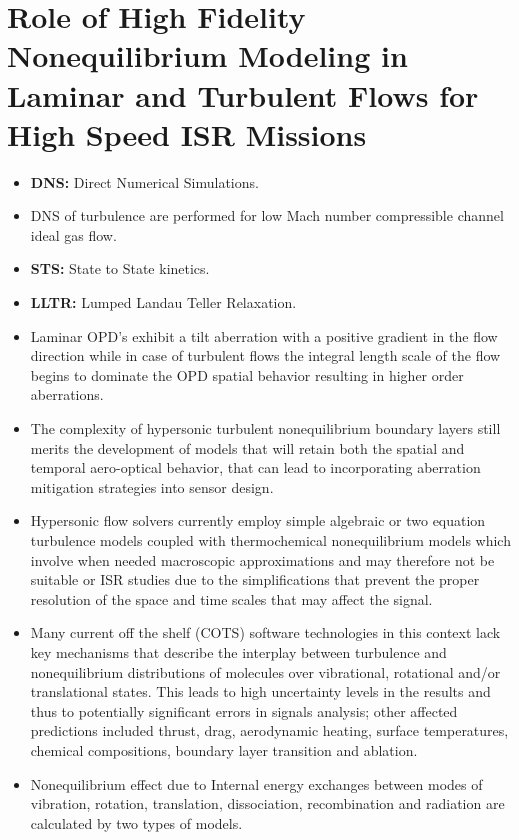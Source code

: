     \section{Role of High Fidelity Nonequilibrium Modeling in Laminar and Turbulent Flows for High Speed ISR Missions \cite{doi:10.2514/6.2016-4317}}
        \begin{itemize}
            \item \textbf{DNS:} Direct Numerical Simulations.
            \item DNS of turbulence are performed for low Mach number compressible channel ideal gas flow. 
            \item \textbf{STS:} State to State kinetics. 
            \item \textbf{LLTR:} Lumped Landau Teller Relaxation.
            \item Laminar OPD's exhibit a tilt aberration with a positive gradient in the flow direction while in case of turbulent flows the integral length scale of the flow begins to dominate the OPD spatial behavior resulting in higher order aberrations.
            \item The complexity of hypersonic turbulent nonequilibrium boundary layers still merits the development of models that will retain both the spatial and temporal aero-optical behavior, that can lead to incorporating aberration mitigation strategies into sensor design.  
            \item Hypersonic flow solvers currently employ simple algebraic or two equation turbulence models coupled with thermochemical nonequilibrium models which involve when needed macroscopic approximations and may therefore not be suitable or ISR studies due to the simplifications that prevent the proper resolution of the space and time scales that may affect the signal. 
            \item Many current off the shelf (COTS) software technologies in this context lack key mechanisms that describe the interplay between turbulence and nonequilibrium distributions of molecules over vibrational, rotational and/or translational states. This leads to high uncertainty levels in the results and thus to potentially significant errors in signals analysis; other affected predictions included thrust, drag, aerodynamic heating, surface temperatures, chemical compositions, boundary layer transition and ablation.
            \item Nonequilibrium effect due to Internal energy exchanges between modes of vibration, rotation, translation, dissociation, recombination and radiation are calculated by two types of models.

\end{itemize}
